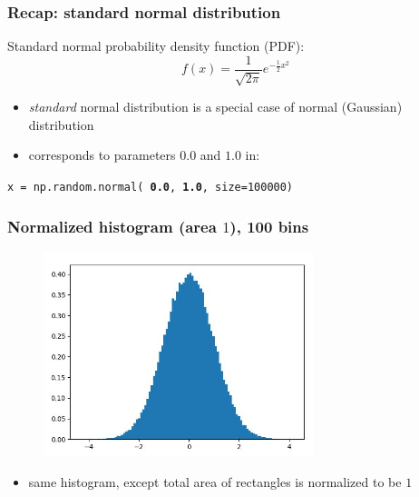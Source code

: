 \documentclass[english,14pt]{beamer}
\newcommand\red[1]{{\color{red} #1}}
\newcommand\blue[1]{{\color{blue} #1}}
\begin{document}
\begin{frame}[fragile]

\frametitle{Recap: standard normal distribution}

Standard normal probability density function (PDF):
\[
\boxed{
f(x) = \frac{1}{\sqrt{2\pi}} e^{-\frac{1}{2}x^2}}
\]

\begin{itemize}
	\item \emph{standard} normal distribution is a special case of normal (Gaussian) distribution
	\item corresponds to parameters \red{$\mathbf{0.0}$} and \blue{$\mathbf{1.0}$} in:
\end{itemize}

{\small
	\texttt{x = np.random.normal(\textbf{\red{0.0}}, \textbf{\blue{1.0}}, size=100000)}
}

\end{frame}


\begin{frame}[fragile]

\frametitle{Normalized histogram (area $1$), 100 bins}

\begin{figure}[ht]
	\centering
	\includegraphics[width=0.7\textwidth]{figures/hist100BinsDensity}
\end{figure}

\vspace*{-5mm}

\begin{itemize}
	\item same histogram, except total area of rectangles is normalized to be $1$
\end{itemize}

\end{frame}
\end{document}
